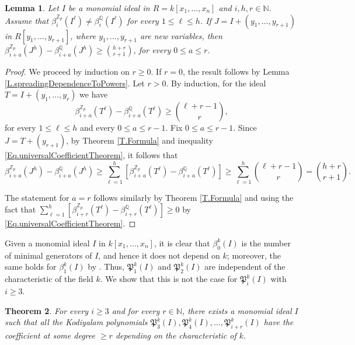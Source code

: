 \documentclass[11pt,oneside]{amsart}
\theoremstyle{plain}
\newtheorem{theorem}{Theorem}[section]
\newtheorem{lemma}[theorem]{Lemma}
\theoremstyle{definition}
\begin{document}
\begin{lemma}\label{L.SpreadingDependence2}
Let $I$ be a monomial ideal in $R=k[x_1,\dots,x_n]$ and $i, h, r \in \mathbb{N}$. Assume that $\beta^{\mathbb{Z}_p}_{i}(I^\ell) \neq \beta^{\mathbb Q}_{i}(I^\ell)$ for every $1 \leq \ell \leq h$. If $J=I+(y_1,\dots,y_{r+1})$ in $R[y_1,\dots,y_{r+1}]$, where $y_1,\dots,y_{r+1}$ are new variables, then $\beta^{\mathbb{Z}_p}_{i+a}(J^h)-\beta^{\mathbb Q}_{i+a}(J^h) \geq \binom{h+r}{r+1}$, for every $0 \leq a \leq r$.
\end{lemma}

\begin{proof}
We proceed by induction on $r \geq 0$. If $r=0$, the result follows by Lemma \ref{L.spreadingDependenceToPowers}. Let $r>0$. By induction, for the ideal $T=I+(y_1,\dots,y_r)$ we have $$\beta^{\mathbb{Z}_p}_{i+a}(T^{\ell})-\beta^{\mathbb Q}_{i+a}(T^{\ell}) \geq \binom{\ell+r-1}{r},$$ for every $1 \leq \ell \leq h$ and every $0 \leq a \leq r-1$. Fix $0 \leq a \leq r-1$. Since $J=T+(y_{r+1})$, by Theorem \ref{T.Formula} and inequality \eqref{Eq.universalCoefficientTheorem}, it follows that 
\[
\beta^{\mathbb{Z}_p}_{i+a}(J^{h})-\beta^{\mathbb Q}_{i+a}(J^{h}) \geq \sum_{\ell=1}^h \left[\beta^{\mathbb{Z}_p}_{i+a}(T^{\ell})-\beta^{\mathbb Q}_{i+a}(T^{\ell}) \right] \geq \sum_{\ell=1}^h \binom{\ell+r-1}{r}=\binom{h+r}{r+1}. 
\]

The statement for $a=r$ follows similarly by Theorem \ref{T.Formula} and using the fact that $\sum_{\ell = 1}^h \left[ \beta^{\mathbb{Z}_p}_{i+r}(T^\ell)-\beta^{\mathbb Q}_{i+r}(T^\ell) \right] \geq 0$ by \eqref{Eq.universalCoefficientTheorem}.
\end{proof}

Given a monomial ideal $I$ in $k[x_1,\dots,x_n]$, it is clear that $\beta^k_0(I)$ is the number of minimal generators of $I$, and hence it does not depend on $k$; moreover, the same holds for $\beta^k_1(I)$ by \cite[Corollary 5.3]{BH95}. Thus, $\mathfrak{P}_1^k(I)$ and $\mathfrak{P}_2^k(I)$ are independent of the characteristic of the field $k$. We show that this is not the case for $\mathfrak{P}_i^k(I)$ with $i \geq 3$.


\begin{theorem} \label{T.Kodiyalam}
For every $i \geq 3$ and for every $r \in \mathbb{N}$, there exists a monomial ideal $I$ such that all the Kodiyalam polynomials $\mathfrak P^k_{3}(I),\mathfrak P^k_{4}(I),\dots,\mathfrak P^k_{i+r}(I)$ have the coefficient at some degree $\geq r$ depending on the characteristic of $k$. 
\end{theorem}
\end{document}
